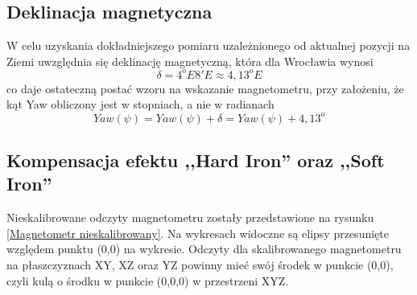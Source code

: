 \subsection{Deklinacja magnetyczna}
W celu uzyskania dokładniejszego pomiaru uzależnionego od aktualnej pozycji na Ziemi uwzględnia się deklinację magnetyczną, która dla Wrocławia wynosi
$$
    \delta = 4^{o}E8'E \approx 4,13^{o}E
$$
co daje ostateczną postać wzoru na wskazanie magnetometru, przy założeniu, że kąt Yaw obliczony jest w stopniach, a nie w radianach
$$
   Yaw(\psi) = Yaw(\psi) + \delta = Yaw(\psi) + 4,13^o 
$$

\subsection{Kompensacja efektu ,,Hard Iron'' oraz ,,Soft Iron''}

Nieskalibrowane odczyty magnetometru zostały przedstawione na rysunku \ref{Magnetometr nieskalibrowany}. Na wykresach widoczne są elipsy przesunięte względem punktu (0,0) na wykresie. Odczyty dla skalibrowanego magnetometru na płaszczyznach XY, XZ oraz YZ powinny mieć swój środek w punkcie (0,0), czyli kulą o środku w punkcie (0,0,0) w przestrzeni XYZ.

